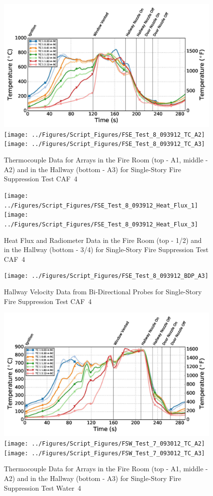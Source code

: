 \documentclass[12pt,oneside]{book}
\begin{document}
\begin{figure}[ht]
\includegraphics[width=.725\columnwidth]{../Figures/Script_Figures/FSE_Test_8_093912_TC_A1}
\texttt{[image: ../Figures/Script\_Figures/FSE\_Test\_8\_093912\_TC\_A2]}
\texttt{[image: ../Figures/Script\_Figures/FSE\_Test\_8\_093912\_TC\_A3]}
\caption{Thermocouple Data for Arrays in the Fire Room (top - A1, middle - A2) and in the Hallway (bottom - A3) for Single-Story Fire Suppression Test CAF~4}
\end{figure}

\begin{figure}[ht]
\texttt{[image: ../Figures/Script\_Figures/FSE\_Test\_8\_093912\_Heat\_Flux\_1]}
\texttt{[image: ../Figures/Script\_Figures/FSE\_Test\_8\_093912\_Heat\_Flux\_3]}
\caption{Heat Flux and Radiometer Data in the Fire Room (top - 1/2) and in the Hallway (bottom - 3/4) for Single-Story Fire Suppression Test CAF~4}
\end{figure}

\begin{figure}[ht]
\texttt{[image: ../Figures/Script\_Figures/FSE\_Test\_8\_093912\_BDP\_A3]}
\caption{Hallway Velocity Data from Bi-Directional Probes for Single-Story Fire Suppression Test CAF~4}
\end{figure}

\begin{figure}[ht]
\includegraphics[width=.725\columnwidth]{../Figures/Script_Figures/FSW_Test_7_093012_TC_A1}
\texttt{[image: ../Figures/Script\_Figures/FSW\_Test\_7\_093012\_TC\_A2]}
\texttt{[image: ../Figures/Script\_Figures/FSW\_Test\_7\_093012\_TC\_A3]}
\caption{Thermocouple Data for Arrays in the Fire Room (top - A1, middle - A2) and in the Hallway (bottom - A3) for Single-Story Fire Suppression Test Water~4}
\end{figure}
\end{document}

